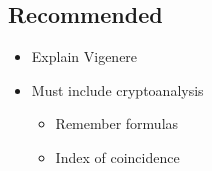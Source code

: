 
\subsection{Recommended}
\begin{itemize}
\item Explain Vigenere
\item Must include cryptoanalysis
  \begin{itemize}
  \item Remember formulas
  \item Index of coincidence
  \end{itemize}
\end{itemize}
